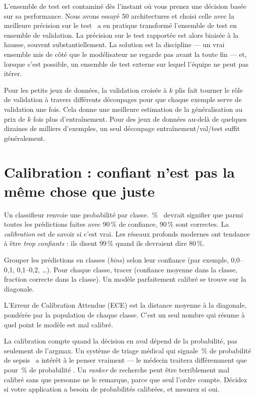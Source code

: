 \begin{warningbox}
L'ensemble de test est contaminé dès l'instant où vous prenez une décision basée sur sa performance. \og Nous avons essayé 50 architectures et choisi celle avec la meilleure précision sur le test \fg\ a en pratique transformé l'ensemble de test en ensemble de validation. La précision sur le test rapportée est alors biaisée à la hausse, souvent substantiellement. La solution est la discipline --- un vrai ensemble mis de côté que le modélisateur ne regarde pas avant la toute fin --- et, lorsque c'est possible, un ensemble de test externe sur lequel l'équipe ne peut pas itérer.
\end{warningbox}

Pour les petits jeux de données, la validation croisée à $k$ plis fait tourner le rôle de validation à travers différents découpages pour que chaque exemple serve de validation une fois. Cela donne une meilleure estimation de la généralisation au prix de $k$ fois plus d'entraînement. Pour des jeux de données au-delà de quelques dizaines de milliers d'exemples, un seul découpage entraînement/val/test suffit généralement.

\section{Calibration : confiant n'est pas la même chose que juste}

Un classifieur renvoie une probabilité par classe. \,\% \fg\ devrait signifier que parmi toutes les prédictions faites avec 90\,\% de confiance, 90\,\% sont correctes. La \emph{calibration} est de savoir si c'est vrai. Les réseaux profonds modernes ont tendance à être \emph{trop confiants} : ils disent 99\,\% quand ils devraient dire 80\,\%.

\begin{definition}
Grouper les prédictions en classes (\emph{bins}) selon leur confiance (par exemple, 0,0--0,1, 0,1--0,2, \ldots). Pour chaque classe, tracer (confiance moyenne dans la classe, fraction correcte dans la classe). Un modèle parfaitement calibré se trouve sur la diagonale.
\end{definition}

L'Erreur de Calibration Attendue (ECE) est la distance moyenne à la diagonale, pondérée par la population de chaque classe. C'est un seul nombre qui résume à quel point le modèle est mal calibré.

\begin{intuition}
La calibration compte quand la décision en aval dépend de la probabilité, pas seulement de l'argmax. Un système de triage médical qui signale \,\% de probabilité de sepsis \fg\ a intérêt à le penser vraiment --- le médecin traitera différemment que pour \,\% de probabilité \fg. Un \emph{ranker} de recherche peut être terriblement mal calibré sans que personne ne le remarque, parce que seul l'ordre compte. Décidez si votre application a besoin de probabilités calibrées, et mesurez si oui.
\end{intuition}

